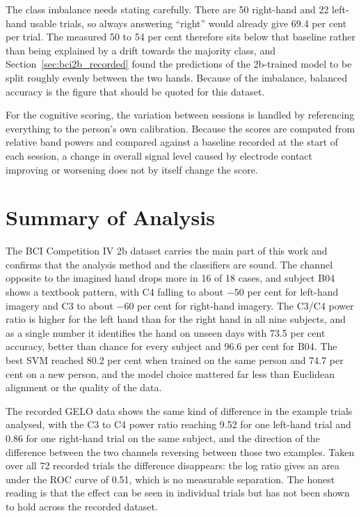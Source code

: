 The class imbalance needs stating carefully. There are 50 right-hand and 22 left-hand
usable trials, so always answering ``right'' would already give 69.4 per cent per trial.
The measured 50 to 54 per cent therefore sits below that baseline rather than being
explained by a drift towards the majority class, and
Section~\ref{sec:bci2b_recorded} found the predictions of the 2b-trained model to be split
roughly evenly between the two hands. Because of the imbalance, balanced accuracy is the
figure that should be quoted for this dataset.

For the cognitive scoring, the variation between sessions is handled by referencing
everything to the person's own calibration. Because the scores are computed from relative
band powers and compared against a baseline recorded at the start of each session, a change
in overall signal level caused by electrode contact improving or worsening does not by
itself change the score.

\section{Summary of Analysis}

The BCI Competition IV 2b dataset carries the main part of this work and confirms that the
analysis method and the classifiers are sound. The
channel opposite to the imagined hand drops more in 16 of 18 cases, and subject B04 shows a
textbook pattern, with C4 falling to about $-50$ per cent for left-hand imagery and C3 to
about $-60$ per cent for right-hand imagery. The C3/C4 power ratio is higher for the left
hand than for the right hand in all nine subjects, and as a single number it identifies
the hand on unseen days with 73.5 per cent accuracy, better than chance for every subject
and 96.6 per cent for B04. The best SVM reached 80.2 per cent when trained on the same
person and 74.7 per cent on a new person, and the model choice mattered far less than
Euclidean alignment or the quality of the data.

The recorded GELO data shows the same kind of difference in the example trials analysed,
with the C3 to C4 power ratio reaching 9.52 for one left-hand trial and 0.86 for one
right-hand trial on the same subject, and the direction of the difference between the two
channels reversing between those two examples. Taken over all 72 recorded trials the
difference disappears: the log ratio gives an area under the ROC curve of 0.51, which is
no measurable separation. The honest reading is that the effect can be seen in individual
trials but has not been shown to hold across the recorded dataset.

